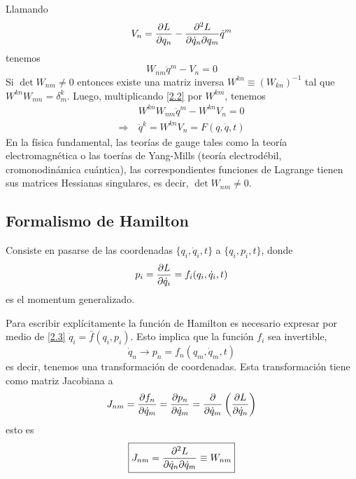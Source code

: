 Llamando 
\begin{equation}
V_n=\pdv{L}{q_n}-\pdv{L}{\dot{q}_n}{q_m}{\dot{q}^m}
\end{equation}
tenemos
\begin{equation}\label{2.2}
  W_{nm}\ddot{q}^{m}-V_n=0
\end{equation}
Si $\det W_{nm}\neq 0$ entonces existe una matriz inversa $W^{kn}\equiv (W_{kn})^{-1}$ tal que $W^{kn}W_{nm}=\delta ^k_m$. Luego, multiplicando \eqref{2.2} por $W^{km}$, tenemos
\begin{align}
 & W^{kn}W_{nm}\ddot{q}^m-W^{kn}V_n=0\\
  \Rightarrow \ & \ddot{q}^k=W^{kn}V_n=F(q,\dot{q},t)
\end{align}
En la física fundamental, las teorías de gauge tales como la teoría electromagnética o las toerías de Yang-Mills (teoría electrodébil, cromonodinámica cuántica), las correspondientes funciones de Lagrange tienen sus matrices Hessianas singulares, es decir, $\det W_{nm}\neq 0$.

\subsection{Formalismo de Hamilton}
Consiste en pasarse de las coordenadas $\{q_i,\dot{q}_i,t\}$ a $\{q_i,p_i,t\}$, donde
\begin{equation}\label{2.3}
  p_i=\pdv{L}{\dot{q}_i}=f_i(q_i,\dot{q}_i,t)
\end{equation}
es el momentum generalizado.

Para escribir explícitamente la función de Hamilton es necesario expresar por medio de \eqref{2.3} $\dot{q}_i=\bar{f}(q_i,p_i)$. Esto implica que la función $f_i$ sea invertible,
\begin{equation}
  \dot{q}_n\to p_n=f_n(q_m,\dot{q}_m,t)
\end{equation}
es decir, tenemos una transformación de coordenadas. Esta transformación tiene como matriz Jacobiana a 
\begin{equation}
  J_{nm}=\pdv{f_n}{\dot{q}_m}=\pdv{p_n}{\dot{q}_m}=\pdv{\dot{q}_m}\left(\pdv{L}{\dot{q}_n}\right)
\end{equation}
esto es
\begin{equation}
  \boxed{J_{nm}=\pdv{L}{\dot{q}_n}{\dot{q}_m}\equiv W_{nm}}
\end{equation}

